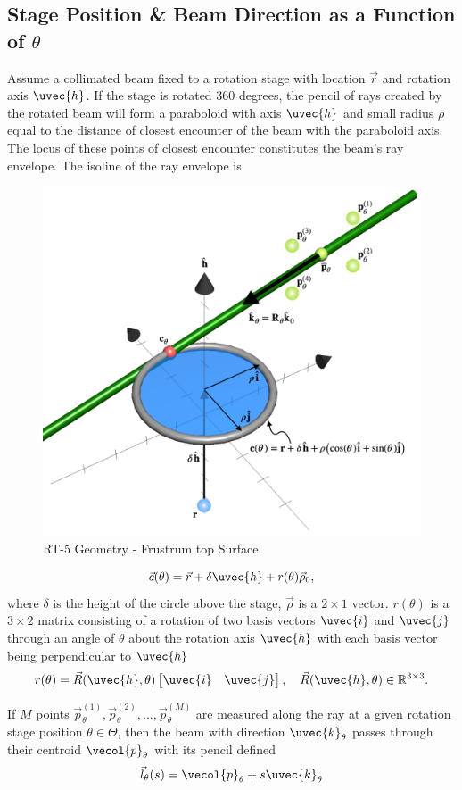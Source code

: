 \subsection{Stage Position \& Beam Direction as a Function of $\theta$}
Assume a collimated beam fixed to a rotation stage with location $\vec{r}$ and rotation axis $\uvec{h}$. If the stage is rotated 360 degrees, the pencil of rays created by the rotated beam will form a paraboloid with axis $\uvec{h}$ and small radius $\rho$ equal to the distance of closest encounter of the beam with the paraboloid axis. The locus of these points of closest encounter constitutes the beam's ray envelope.  The isoline of the ray envelope is
%
\begin{figure}
    \centering
    \includegraphics[width=0.5\linewidth]{figures/envelope_geometry.png}
    \caption{RT-5 Geometry - Frustrum top Surface}
    \label{fig:frustrum}
\end{figure}
%
\begin{equation}
    \vec{c}(\theta) = \vec{r} + \delta \uvec{h} + r(\theta) \vec{\rho}_0,
    \label{eqn:section}
\end{equation}
%
where $\delta$ is the height of the circle above the stage, $\vec{\rho}$ is a $2 \times 1$ vector. $r(\theta)$ is a $3 \times 2$ matrix consisting of a rotation of two basis vectors $\uvec{i}$ and $\uvec{j}$ through an angle of $\theta$ about the rotation axis $\uvec{h}$ with each basis vector being perpendicular to $\uvec{h}$
%
\begin{equation}
    r(\theta) = \vec{R}(\uvec{h}, \theta) \begin{bmatrix}
        \uvec{i} & \uvec{j}
    \end{bmatrix},
    \quad \vec{R}(\uvec{h}, \theta) \in \mathbb{R}^{3 \times 3}.
\end{equation}

If $M$ points $\vec{p}_\theta^{(1)}, \vec{p}_\theta^{(2)}, ..., \vec{p}_\theta^{(M)}$ are measured along the ray at a given rotation stage position $\theta \in \Theta$, then the beam with direction $\uvec{k}_{\theta}$ passes through their centroid $\vecol{p}_\theta$ with its pencil defined
%
\begin{align}
    \vec{l}_\theta(s) = \vecol{p}_\theta + s \uvec{k}_{\theta}
\end{align}

